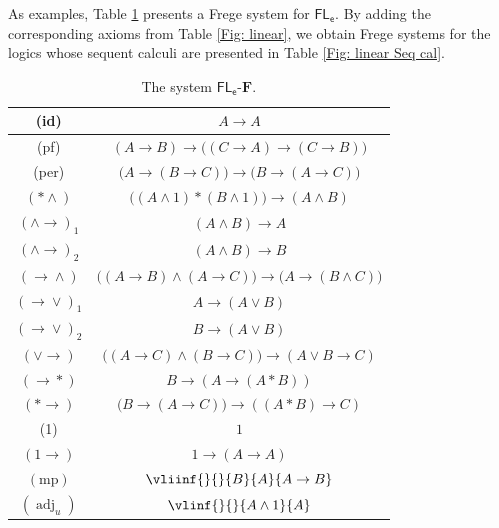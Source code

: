 \documentclass[12pt,a4paper]{article}
\theoremstyle{plain}
\theoremstyle{definition}
\newcommand{\st}{*}
\newcommand{\FL}{\mathsf{FL_e}}
\newcommand{\F}{\mathbf{F}}
\begin{document}
As examples, Table \ref{Fig: FL_e} presents a Frege system for $\mathsf{FL_e}$. By adding the corresponding axioms from Table \ref{Fig: linear}, we obtain Frege systems for the logics whose sequent calculi are presented in Table \ref{Fig: linear Seq cal}.
\begin{table}[h]
\centering
\normalsize
\renewcommand{\arraystretch}{0.95}
\begin{tabular}{|c|c|}
\hline
(id) & $A \rightarrow A$ \\
\hline
(pf) & $(A \rightarrow B) \rightarrow \big((C \rightarrow A) \rightarrow(C \rightarrow B) \big)$  \\
\hline
(per) & $\big(A \rightarrow(B \rightarrow C)\big) \rightarrow \big(B \rightarrow(A \rightarrow C) \big)$  \\
\hline
$(* \wedge)$ & $\big((A \wedge 1) * (B \wedge 1)\big) \rightarrow(A \wedge B)$ \\
\hline
$(\wedge \! \to)_1$ & $(A \wedge B) \rightarrow A$ \\
\hline
$(\wedge \! \to)_2$ & $(A \wedge B) \rightarrow B$  \\
\hline
$(\rightarrow \! \wedge)$ & $\big((A \rightarrow B) \wedge(A \rightarrow C)\big) \rightarrow \big(A \rightarrow(B \wedge C) \big)$ \\
\hline
$(\rightarrow \! \vee)_1$ & $A \rightarrow(A \vee B)$  \\
\hline
$(\rightarrow \! \vee)_2$ & $B \rightarrow(A \vee B)$  \\
\hline
$(\vee \! \rightarrow)$ & $\big((A \rightarrow C) \wedge(B \rightarrow C)\big) \rightarrow (A \vee B \rightarrow C)$ \\
\hline
$(\rightarrow \! *)$ & $B \rightarrow(A \rightarrow (A \st B))$  \\
\hline
$(* \! \rightarrow)$ & $\big(B \rightarrow(A \rightarrow C)\big) \rightarrow((A \st B) \rightarrow C)$  \\
\hline
(1) & $1$  \\
\hline
$(1 \! \rightarrow)$ & $1 \rightarrow(A \rightarrow A)$  \\
\hline
$(\mathrm{mp})$ & $\vliinf{}{}{B}{A}{A \to B}$ \\
\hline
$(\operatorname{adj}_u)$ & $\vlinf{}{}{A \wedge 1}{A}$ \\
\hline
\end{tabular}
\vspace{3pt}
\caption{The system $\FL$-$\F$.}
\label{Fig: FL_e}
\end{table}
\end{document}
